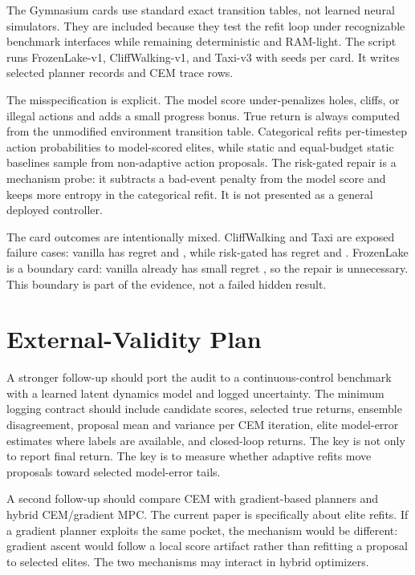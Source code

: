 The Gymnasium cards use standard exact transition tables, not learned neural
simulators. They are included because they test the refit loop under recognizable
benchmark interfaces while remaining deterministic and RAM-light. The script
 runs FrozenLake-v1,
CliffWalking-v1, and Taxi-v3 with \VFourGymSeeds{} seeds per card. It writes
\VFourGymRecordRows{} selected planner records and \VFourGymCurveRows{} CEM
trace rows.

The misspecification is explicit. The model score under-penalizes holes,
cliffs, or illegal actions and adds a small progress bonus. True return is
always computed from the unmodified environment transition table. Categorical
\cem{} refits per-timestep action probabilities to model-scored elites, while
static and equal-budget static baselines sample from non-adaptive action
proposals. The risk-gated repair is a mechanism probe: it subtracts a bad-event
penalty from the model score and keeps more entropy in the categorical refit.
It is not presented as a general deployed controller.

The card outcomes are intentionally mixed. CliffWalking and Taxi are exposed
failure cases: vanilla \cem{} has regret \VFourGymCliffCEMRegret{} and
\VFourGymTaxiCEMRegret{}, while risk-gated \cem{} has regret
\VFourGymCliffRepairRegret{} and \VFourGymTaxiRepairRegret{}. FrozenLake is a
boundary card: vanilla \cem{} already has small regret
\VFourGymFrozenBoundaryRegret{}, so the repair is unnecessary. This boundary is
part of the evidence, not a failed hidden result.

\section{External-Validity Plan}
\label{app:external-validity}

A stronger follow-up should port the audit to a continuous-control benchmark
with a learned latent dynamics model and logged uncertainty. The minimum
logging contract should include candidate scores, selected true returns,
ensemble disagreement, proposal mean and variance per CEM iteration, elite
model-error estimates where labels are available, and closed-loop returns. The
key is not only to report final return. The key is to measure whether adaptive
refits move proposals toward selected model-error tails.

A second follow-up should compare CEM with gradient-based planners and hybrid
CEM/gradient MPC. The current paper is specifically about elite refits. If a
gradient planner exploits the same pocket, the mechanism would be different:
gradient ascent would follow a local score artifact rather than refitting a
proposal to selected elites. The two mechanisms may interact in hybrid
optimizers.

